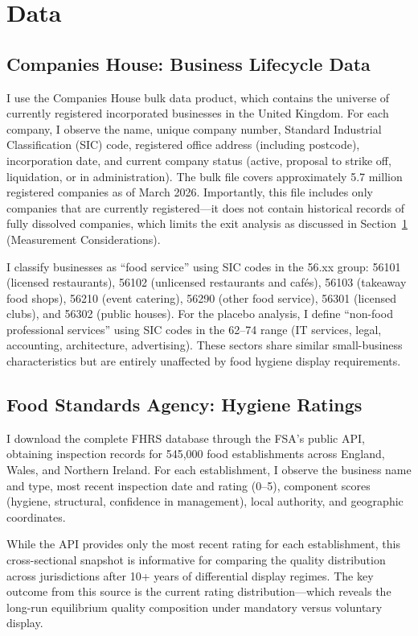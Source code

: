 \documentclass[12pt]{article}
\begin{document}
\section{Data}
\label{sec:data}

\subsection{Companies House: Business Lifecycle Data}

I use the Companies House bulk data product, which contains the universe of currently registered incorporated businesses in the United Kingdom. For each company, I observe the name, unique company number, Standard Industrial Classification (SIC) code, registered office address (including postcode), incorporation date, and current company status (active, proposal to strike off, liquidation, or in administration). The bulk file covers approximately 5.7 million registered companies as of March 2026. Importantly, this file includes only companies that are currently registered---it does not contain historical records of fully dissolved companies, which limits the exit analysis as discussed in Section~\ref{sec:data} (Measurement Considerations).

I classify businesses as ``food service'' using SIC codes in the 56.xx group: 56101 (licensed restaurants), 56102 (unlicensed restaurants and cafés), 56103 (takeaway food shops), 56210 (event catering), 56290 (other food service), 56301 (licensed clubs), and 56302 (public houses). For the placebo analysis, I define ``non-food professional services'' using SIC codes in the 62--74 range (IT services, legal, accounting, architecture, advertising). These sectors share similar small-business characteristics but are entirely unaffected by food hygiene display requirements.

\subsection{Food Standards Agency: Hygiene Ratings}

I download the complete FHRS database through the FSA's public API, obtaining inspection records for 545,000 food establishments across England, Wales, and Northern Ireland. For each establishment, I observe the business name and type, most recent inspection date and rating (0--5), component scores (hygiene, structural, confidence in management), local authority, and geographic coordinates.

While the API provides only the most recent rating for each establishment, this cross-sectional snapshot is informative for comparing the quality distribution across jurisdictions after 10+ years of differential display regimes. The key outcome from this source is the current rating distribution---which reveals the long-run equilibrium quality composition under mandatory versus voluntary display.
\end{document}
